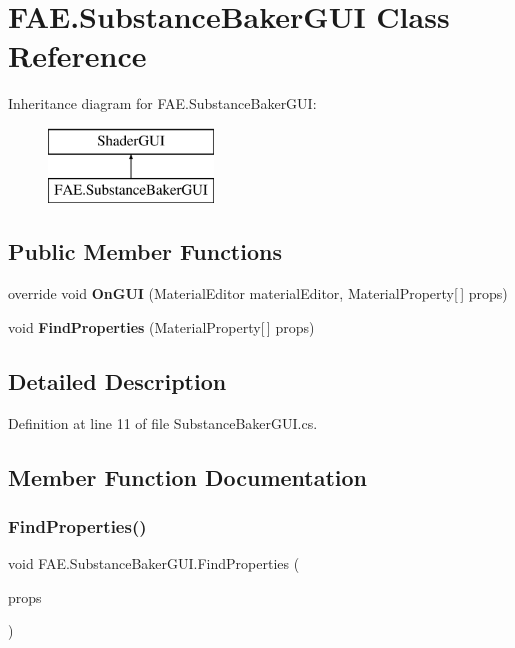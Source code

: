 \section{F\+A\+E.\+Substance\+Baker\+G\+UI Class Reference}
\label{class_f_a_e_1_1_substance_baker_g_u_i}
Inheritance diagram for F\+A\+E.\+Substance\+Baker\+G\+UI\+:\begin{figure}[H]
\begin{center}
\leavevmode
\includegraphics[height=2.000000cm]{class_f_a_e_1_1_substance_baker_g_u_i}
\end{center}
\end{figure}
\subsection*{Public Member Functions}
\begin{DoxyCompactItemize}
\item 
override void \textbf{ On\+G\+UI} (Material\+Editor material\+Editor, Material\+Property[$\,$] props)
\item 
void \textbf{ Find\+Properties} (Material\+Property[$\,$] props)
\end{DoxyCompactItemize}


\subsection{Detailed Description}


Definition at line 11 of file Substance\+Baker\+G\+U\+I.\+cs.



\subsection{Member Function Documentation}
\mbox{\label{class_f_a_e_1_1_substance_baker_g_u_i_a6da4f08521265093ed0954dab7f2bfa4}} 
\subsubsection{Find\+Properties()}
{\footnotesize\ttfamily void F\+A\+E.\+Substance\+Baker\+G\+U\+I.\+Find\+Properties (\begin{DoxyParamCaption}\item[{Material\+Property [$\,$]}]{props }\end{DoxyParamCaption})}



